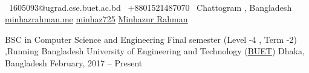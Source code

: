 \documentclass[]{awesome-cv}
\begin{document}
    
\begin{center}
	  \\
	\vspace{2mm}
	{\faEnvelope\ 1605093@ugrad.cse.buet.ac.bd} \hspace{5mm} {\faMobile\ +8801521487070}  \hspace{5mm} {\faMapMarker\ Chattogram , Bangladesh} \hspace{5mm} {\faLink\href{https://minhazrahman.me}{\underline{minhazrahman.me}}}  {\faGithub \href{https://github.com/minhaz725}{\underline{minhaz725}}} \hspace{5mm} {\faLinkedin \href{https://www.linkedin.com/in/minhaz725/}{\underline{Minhazur Rahman}}}
\end{center}
\begin{cventries}
	\cventry
	{BSC in Computer Science and Engineering \newline Final semester (Level -4 , Term -2) ,Running }
	{Bangladesh University of Engineering and Technology (\href{https://www.buet.ac.bd/}{\underline{BUET}})}
	{Dhaka, Bangladesh}
	{February, 2017 – Present}
	{}
\end{cventries}

\vspace{-4mm}
\end{document}
